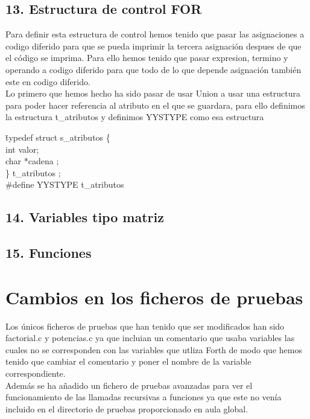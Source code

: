 \documentclass[11pt,spanish]{article}
\begin{document}
		\subsection*{13. Estructura de control FOR }
		\label{subsec:13}
		Para definir esta estructura de control hemos tenido que pasar las asignaciones a codigo diferido para que se pueda imprimir la tercera asignación despues de que el código se imprima. Para ello hemos tenido que pasar expresion, termino y operando a codigo diferido para que todo de lo que depende asignación también este en codigo diferido.\\
		Lo primero que hemos hecho ha sido pasar de usar Union a usar una estructura para poder hacer referencia al atributo en el que se guardara, para ello definimos la estructura t\_atributos y definimos YYSTYPE como esa estructura
		\begin{tabbing}
			\hspace*{1cm}\=
			typedef struct s\_atributos \{ \\
			\>	int valor;\\
			\>	char *cadena ;\\
			\} t\_atributos ; \\
			\#define YYSTYPE t\_atributos 
		\end{tabbing}
		\subsection*{14. Variables tipo matriz }
		\label{subsec:14}

		\subsection*{15. Funciones }
		\label{subsec:15}
		
	\section{Cambios en los ficheros de pruebas}
	Los únicos ficheros de pruebas que han tenido que ser modificados han sido factorial.c y potencias.c ya que incluian un comentario que usaba variables las cuales no se corresponden con las variables que utliza Forth de modo que hemos tenido que cambiar el comentario y poner el nombre de la variable correspondiente.\\
	Además se ha añadido un fichero de pruebas avanzadas para ver el funcionamiento de las llamadas recursivas a funciones ya que este no venía incluido en el directorio de pruebas proporcionado en aula global.
\end{document}
